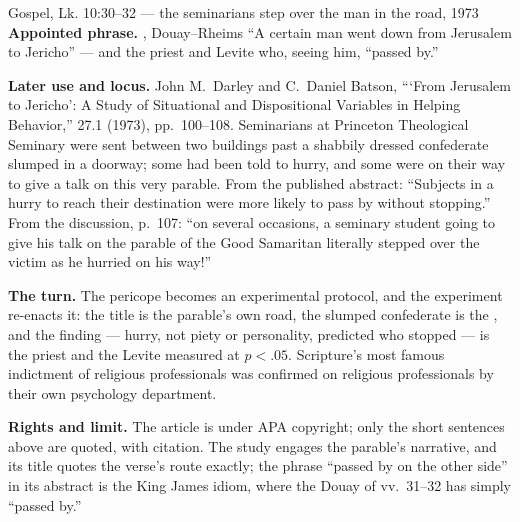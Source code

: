 \begin{afterlife}{Gospel, Lk. 10:30--32 --- the seminarians step over the man in the road, 1973}
\textbf{Appointed phrase.} , Douay--Rheims ``A certain man went down from Jerusalem to Jericho''
--- and the priest and Levite who, seeing him, ``passed by.''

\textbf{Later use and locus.} John M.\ Darley and C.\ Daniel Batson, ```From
Jerusalem to Jericho': A Study of Situational and Dispositional Variables in
Helping Behavior,''  27.1
(1973), pp.\ 100--108. Seminarians at Princeton Theological Seminary were sent
between two buildings past a shabbily dressed confederate slumped in a
doorway; some had been told to hurry, and some were on their way to give a
talk on this very parable. From the published abstract: ``Subjects in a hurry
to reach their destination were more likely to pass by without stopping.''
From the discussion, p.~107: ``on several occasions, a seminary student going
to give his talk on the parable of the Good Samaritan literally stepped over
the victim as he hurried on his way!''

\textbf{The turn.} The pericope becomes an experimental protocol, and the
experiment re-enacts it: the title is the parable's own road, the slumped
confederate is the , and the finding --- hurry, not
piety or personality, predicted who stopped --- is the priest and the Levite
measured at $p<.05$. Scripture's most famous indictment of religious
professionals was confirmed on religious professionals by their own
psychology department.

\textbf{Rights and limit.} The article is under APA copyright; only the short
sentences above are quoted, with citation. The study engages the parable's
narrative, and its title quotes the verse's route exactly; the phrase ``passed
by on the other side'' in its abstract is the King James idiom, where the
Douay of vv.\ 31--32 has simply ``passed by.''
\end{afterlife}

